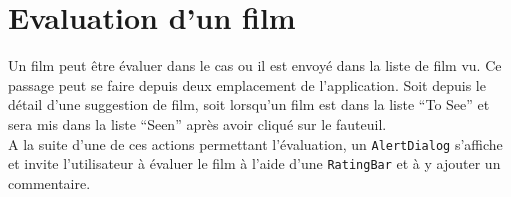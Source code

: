 \section{Evaluation d'un film}
Un film peut être évaluer dans le cas ou il est envoyé dans la liste de film vu. Ce passage peut se faire depuis deux emplacement de l'application. Soit depuis le détail d'une suggestion de film, soit lorsqu'un film est dans la liste ``To See'' et sera mis dans la liste ``Seen'' après avoir cliqué sur le fauteuil.\\
A la suite d'une de ces actions permettant l'évaluation, un \texttt{AlertDialog} s'affiche et invite l'utilisateur à évaluer le film à l'aide d'une \texttt{RatingBar} et à y ajouter un commentaire.















